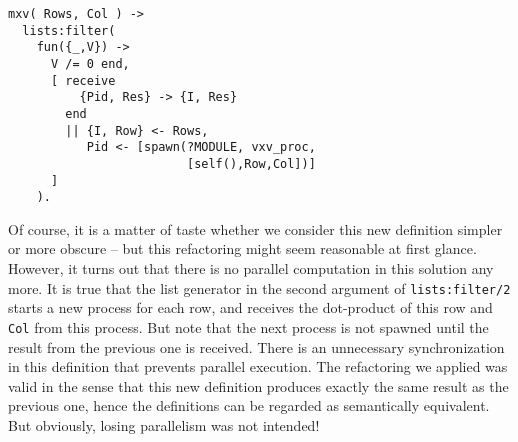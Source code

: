 \begin{lstlisting}[language=myerlang]
mxv( Rows, Col ) ->
  lists:filter(
    fun({_,V}) ->
      V /= 0 end,
      [ receive
          {Pid, Res} -> {I, Res}
        end
        || {I, Row} <- Rows,
           Pid <- [spawn(?MODULE, vxv_proc,
                         [self(),Row,Col])]
      ]
    ).        
\end{lstlisting}


Of course, it is a matter of taste whether we consider this new
definition simpler or more obscure -- but this refactoring might seem
reasonable at first glance. However, it turns out that
there is no parallel computation in this solution any more. 
It is true that the list
generator in the second argument of \lstinline[language=myerlang]{lists:filter/2} starts a new
process for each row, and receives the dot-product of this row and
\lstinline[language=myerlang]{Col} from this process. But note that the next process is not spawned
until the result from the previous one is received. There is an
unnecessary synchronization in this definition that prevents parallel
execution. The refactoring we applied was valid in the sense that this
new definition produces exactly the same result as the previous one,
hence the definitions can be regarded as semantically equivalent.
But obviously, losing parallelism was not intended!

